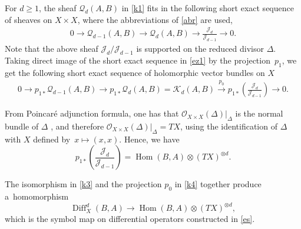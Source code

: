 \documentclass[10pt,a4paper]{amsart}
\numberwithin{equation}{section}
\begin{document}
For $d \geq 1$, the sheaf ${\mathcal Q}_d(A, B)$ in \eqref{k1} fits in the following short
exact sequence of sheaves on $X\times X$, where the abbreviations of \eqref{abr} are used,
\begin{gather}\label{ez1}
0 \longrightarrow {\mathcal Q}_{d-1}(A, B) \longrightarrow {\mathcal Q}_{d}(A, B) \longrightarrow
 \frac{\mathcal{J}_d}{\mathcal{J}_{d-1}} \longrightarrow 0.
\end{gather}
Note that the above sheaf $\mathcal{J}_d/\mathcal{J}_{d-1}$ is supported on the reduced divisor ${\Delta}$.
Taking direct image of the short exact sequence in \eqref{ez1} by the projection~$p_1$, we get the following
short exact sequence of holomorphic vector bundles on $X$
\begin{gather}
0 \longrightarrow p_{1*} {\mathcal Q}_{d-1}(A, B) \longrightarrow p_{1*} {\mathcal Q}_d(A, B)
 = {\mathcal K}_d(A, B)
\stackrel{p_0}{\longrightarrow} p_{1*} \left( \frac{\mathcal{J}_d}{\mathcal{J}_{d-1}}\right) \longrightarrow 0.\label{k4}
\end{gather}

From Poincar\'e adjunction formula, one has that ${\mathcal O}_{X\times X}({\Delta})\big\vert_{\Delta}$
is the normal bundle of ${\Delta}$ \cite[p.~146]{GH}, and therefore ${\mathcal O}_{X\times X}({\Delta})\big\vert_{\Delta} = TX$, using the identification of
${\Delta}$ with $X$ defined by~$x \longmapsto (x, x)$. Hence, we have
\[
p_{1*}\left( \frac{\mathcal{J}_d}{\mathcal{J}_{d-1}}\right) = \operatorname{Hom}(B, A)\otimes (TX)^{\otimes d}.
\]

\begin{Remark} The isomorphism in \eqref{k3} and the projection $p_0$ in \eqref{k4} together produce a~homomorphism
\begin{equation}\label{k5}
\operatorname{Diff}^d_X(B, A) \longrightarrow \operatorname{Hom}(B, A)\otimes (TX)^{\otimes d},
\end{equation}
which is the symbol map on differential operators constructed in \eqref{es}.\end{Remark}
\end{document}
